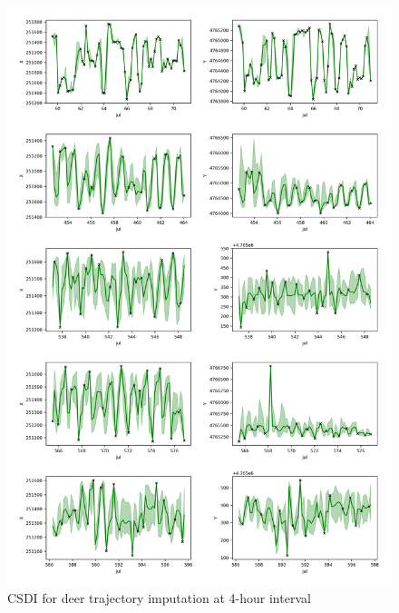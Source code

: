 \documentclass[11pt]{article}
\begin{document}
\begin{figure}[h]
  \centering
  \includegraphics[width=\textwidth]{../figure/5094_4_hour_trajectory_imputation} %
  \caption{CSDI for deer trajectory imputation at 4-hour interval}
  \label{fig: csdi_aug} %
\end{figure}
\end{document}
